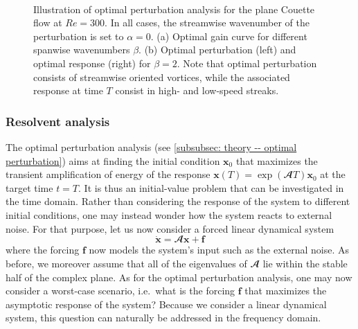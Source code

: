       \begin{figure}[b]
        \centering
         \\
        \caption{Illustration of optimal perturbation analysis for the plane Couette flow at $Re=300$. In all cases, the streamwise wavenumber of the perturbation is set to $\alpha=0$. (a) Optimal gain curve for different spanwise wavenumbers $\beta$. (b) Optimal perturbation (left) and optimal response (right) for $\beta=2$. Note that optimal perturbation consists of streamwise oriented vortices, while the associated response at time $T$ consist in high- and low-speed streaks.}
        \label{fig: theory -- optimal perturbation illustration}
      \end{figure}

    \subsubsection{Resolvent analysis}
    \label{subsubsec: theory -- resolvent perturbation}

    The optimal perturbation analysis (see \textsection \ref{subsubsec: theory -- optimal perturbation}) aims at finding the initial condition $\mathbf{x}_0$ that maximizes the transient amplification of energy of the response $\mathbf{x}(T) = \exp \left( \mathbfcal{A} T \right) \mathbf{x}_0$ at the target time $t=T$. It is thus an initial-value problem that can be investigated in the time domain. Rather than considering the response of the system to different initial conditions, one may instead wonder how the system reacts to external noise. For that purpose, let us now consider a forced linear dynamical system
    \begin{equation}
      \dot{\mathbf{x}} = \mathbfcal{A} \mathbf{x} + \mathbf{f}
      \label{eq: theory -- forced linear system}
    \end{equation}
    where the forcing $\mathbf{f}$ now models the system's input such as the external noise. As before, we moreover assume that all of the eigenvalues of $\mathbfcal{A}$ lie within the stable half of the complex plane. As for the optimal perturbation analysis, one may now consider a worst-case scenario, i.e.\ what is the forcing $\mathbf{f}$ that maximizes the asymptotic response of the system? Because we consider a linear dynamical system, this question can naturally be addressed in the frequency domain.

